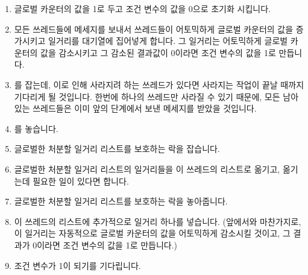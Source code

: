 {	\begin{enumerate}
	\item	글로벌 카운터의 값을 1로 두고 조건 변수의 값을 0으로 초기화
		시킵니다.
	\item	모든 쓰레드들에 메세지를 보내서 쓰레드들이 어토믹하게 글로벌
		카운터의 값을 증가시키고 일거리를 대기열에 집어넣게 합니다.
		그 일거리는 어토믹하게 글로벌 카운터의 값을 감소시키고 그
		감소된 결과값이 0이라면 조건 변수의 값을 1로 만듭니다.
	\item	{} 를 잡는데, 이로 인해 사라지려 하는 쓰레드가 있다면
		사라지는 작업이 끝날 때까지 기다리게 될 것입니다.
		한번에 하나의 쓰레드만 사라질 수 있기 때문에, 모든 남아있는
		쓰레드들은 이미 앞의 단계에서 보낸 메세지를 받았을 것입니다.
	\item	{} 를 놓습니다.
	\item	글로벌한 처분할 일거리 리스트를 보호하는 락을 잡습니다.
	\item	글로벌한 처분할 일거리 리스트의 일거리들을 이 쓰레드의 리스트로
		옮기고, 옮기는데 필요한 일이 있다면 합니다.
	\item	글로벌한 처분할 일거리 리스트를 보호하는 락을 놓아줍니다.
	\item	이 쓰레드의 리스트에 추가적으로 일거리 하나를 넣습니다.
		(앞에서와 마찬가지로, 이 일거리는 자동적으로 글로벌 카운터의
		값을 어토믹하게 감소시킬 것이고, 그 결과가 0이라면 조건 변수의
		값을 1로 만듭니다.)
	\item	조건 변수가 1이 되기를 기다립니다.

	\end{enumerate}

}
